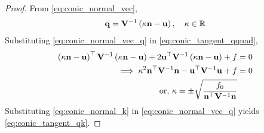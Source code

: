 \begin{proof}
  From \eqref{eq:conic_normal_vec},
\begin{align}
\label{eq:conic_normal_vec_q}
 \mathbf{q} = \mathbf{V}^{-1}\left(\kappa \mathbf{n}-\mathbf{u}\right), \quad \kappa \in \mathbb{R}
\end{align}
Substituting \eqref{eq:conic_normal_vec_q}
in \eqref{eq:conic_tangent_qquad},
\begin{align}
\left(\kappa \mathbf{n}-\mathbf{u}\right)^{\top}\mathbf{V}^{-1}\left(\kappa \mathbf{n}-\mathbf{u}\right) 
+ 2\mathbf{u}^{\top}\mathbf{V}^{-1}\left(\kappa \mathbf{n}-\mathbf{u}\right) +f &= 0
\\
\implies 
\kappa^2 \mathbf{n}^{\top}\mathbf{V}^{-1}\mathbf{n} - \mathbf{u}^{\top}\mathbf{V}^{-1}\mathbf{u} + f &=0
 \\
 \text{or, } \kappa = \pm \sqrt{\frac{
	f_0 
 }{\mathbf{n}^{\top}\mathbf{V}^{-1}\mathbf{n}}} &
	\label{eq:conic_normal_k}
\end{align}
%
Substituting \eqref{eq:conic_normal_k} in \eqref{eq:conic_normal_vec_q}
yields \eqref{eq:conic_tangent_qk}.
%
\end{proof}


